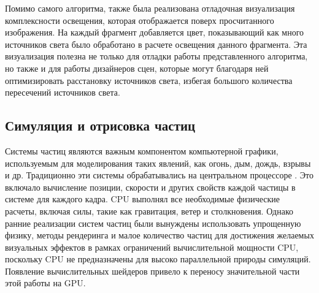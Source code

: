 Помимо самого алгоритма, также была реализована отладочная визуализация комплексности освещения, которая отображается поверх просчитанного изображения. На каждый фрагмент добавляется цвет, показывающий как много источников света было обработано в расчете освещения данного фрагмента. Эта визуализация полезна не только для отладки работы представленного алгоритма, но также и для работы дизайнеров сцен, которые могут благодаря ней оптимизировать расстановку источников света, избегая большого количества пересечений источников света.

\subsection{Симуляция и отрисовка частиц}
Системы частиц являются важным компонентом компьютерной графики, используемым для моделирования таких явлений, как огонь, дым, дождь, взрывы и др. Традиционно эти системы обрабатывались на центральном процессоре \cite{lucasfilm_particle_systems_1983}. Это включало вычисление позиции, скорости и других свойств каждой частицы в системе для каждого кадра. CPU выполнял все необходимые физические расчеты, включая силы, такие как гравитация, ветер и столкновения. Однако ранние реализации систем частиц были вынуждены использовать упрощенную физику, методы рендеринга и малое количество частиц для достижения желаемых визуальных эффектов в рамках ограничений вычислительной мощности CPU, поскольку CPU не предназначены для высоко параллельной природы симуляций. Появление вычислительных шейдеров привело к переносу значительной части этой работы на GPU.

